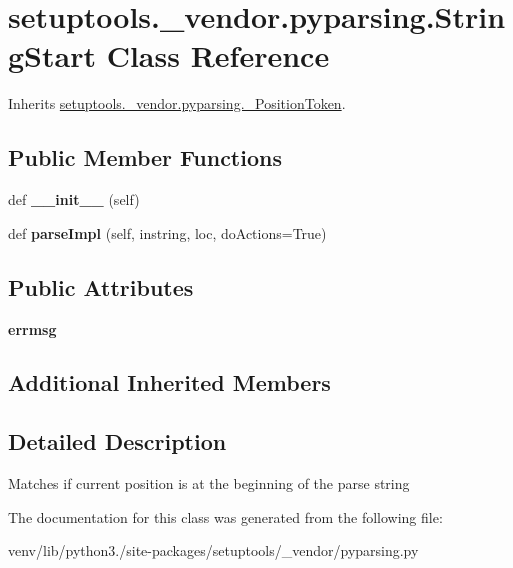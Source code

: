 \hypertarget{classsetuptools_1_1__vendor_1_1pyparsing_1_1_string_start}{}\section{setuptools.\+\_\+vendor.\+pyparsing.\+String\+Start Class Reference}
\label{classsetuptools_1_1__vendor_1_1pyparsing_1_1_string_start}


Inherits \hyperlink{classsetuptools_1_1__vendor_1_1pyparsing_1_1___position_token}{setuptools.\+\_\+vendor.\+pyparsing.\+\_\+\+Position\+Token}.

\subsection*{Public Member Functions}
\begin{DoxyCompactItemize}
\item 
\mbox{\label{classsetuptools_1_1__vendor_1_1pyparsing_1_1_string_start_aaa2b2ad069096b3fc7730ecce4d7f01c}} 
def {\bfseries \+\_\+\+\_\+init\+\_\+\+\_\+} (self)
\item 
\mbox{\label{classsetuptools_1_1__vendor_1_1pyparsing_1_1_string_start_af632384aa7a59d6eeeb0400f54a04dda}} 
def {\bfseries parse\+Impl} (self, instring, loc, do\+Actions=True)
\end{DoxyCompactItemize}
\subsection*{Public Attributes}
\begin{DoxyCompactItemize}
\item 
\mbox{\label{classsetuptools_1_1__vendor_1_1pyparsing_1_1_string_start_aa9d18ab5768e58a127fe5e09def2ce0f}} 
{\bfseries errmsg}
\end{DoxyCompactItemize}
\subsection*{Additional Inherited Members}


\subsection{Detailed Description}
\begin{DoxyVerb}Matches if current position is at the beginning of the parse string
\end{DoxyVerb}
 

The documentation for this class was generated from the following file\+:\begin{DoxyCompactItemize}
\item 
venv/lib/python3./site-\/packages/setuptools/\+\_\+vendor/pyparsing.\+py\end{DoxyCompactItemize}
